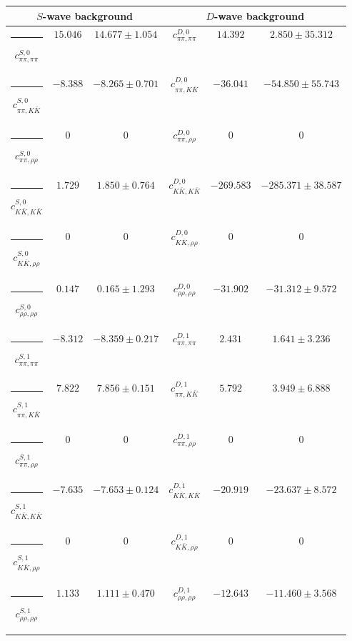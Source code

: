 \begin{table}[h]
\begin{ruledtabular}
\begin{tabular}{c c c c c c c c c}
\end{tabular}
\vspace{2em}
\begin{tabular}{c c c c c c}
\multicolumn{3}{c}{$S$-wave background}  & \multicolumn{3}{c}{$D$-wave background} \\ \hline
\rule[-0.2cm]{-0.1cm}{.55cm} $c^{S,0}_{\pi\pi,\pi\pi}$ &$15.046$ & $14.677 \pm 1.054$ & $c^{D,0}_{\pi\pi,\pi\pi}$ &$14.392$ & $2.850 \pm 35.312$ \\
\rule[-0.2cm]{-0.1cm}{.55cm} $c^{S,0}_{\pi\pi,K\bar K}$ &$-8.388$ & $-8.265 \pm 0.701$ & $c^{D,0}_{\pi\pi,K\bar K}$ &$-36.041$ & $-54.850 \pm 55.743$ \\
\rule[-0.2cm]{-0.1cm}{.55cm} $c^{S,0}_{\pi\pi,\rho\rho}$ &$0$ & $0$ & $c^{D,0}_{\pi\pi,\rho\rho}$ &$0$ & $0$ \\
\rule[-0.2cm]{-0.1cm}{.55cm} $c^{S,0}_{K\bar K,K\bar K}$ &$1.729$ & $1.850 \pm 0.764$ & $c^{D,0}_{K\bar K,K\bar K}$ &$-269.583$ & $-285.371 \pm 38.587$ \\
\rule[-0.2cm]{-0.1cm}{.55cm} $c^{S,0}_{K\bar K,\rho\rho}$ &$0$ & $0$ & $c^{D,0}_{K\bar K,\rho\rho}$ &$0$ & $0$ \\
\rule[-0.2cm]{-0.1cm}{.55cm} $c^{S,0}_{\rho\rho,\rho\rho}$ &$0.147$ & $0.165 \pm 1.293$ & $c^{D,0}_{\rho\rho,\rho\rho}$ &$-31.902$ & $-31.312 \pm 9.572$ \\
\rule[-0.2cm]{-0.1cm}{.55cm} $c^{S,1}_{\pi\pi,\pi\pi}$ &$-8.312$ & $-8.359 \pm 0.217$ & $c^{D,1}_{\pi\pi,\pi\pi}$ &$2.431$ & $1.641 \pm 3.236$ \\
\rule[-0.2cm]{-0.1cm}{.55cm} $c^{S,1}_{\pi\pi,K\bar K}$ &$7.822$ & $7.856 \pm 0.151$ & $c^{D,1}_{\pi\pi,K\bar K}$ &$5.792$ & $3.949 \pm 6.888$ \\
\rule[-0.2cm]{-0.1cm}{.55cm} $c^{S,1}_{\pi\pi,\rho\rho}$ &$0$ & $0$ & $c^{D,1}_{\pi\pi,\rho\rho}$ &$0$ & $0$ \\
\rule[-0.2cm]{-0.1cm}{.55cm} $c^{S,1}_{K\bar K,K\bar K}$ &$-7.635$ & $-7.653 \pm 0.124$ & $c^{D,1}_{K\bar K,K\bar K}$ &$-20.919$ & $-23.637 \pm 8.572$ \\
\rule[-0.2cm]{-0.1cm}{.55cm} $c^{S,1}_{K\bar K,\rho\rho}$ &$0$ & $0$ & $c^{D,1}_{K\bar K,\rho\rho}$ &$0$ & $0$ \\
\rule[-0.2cm]{-0.1cm}{.55cm} $c^{S,1}_{\rho\rho,\rho\rho}$ &$1.133$ & $1.111 \pm 0.470$ & $c^{D,1}_{\rho\rho,\rho\rho}$ &$-12.643$ & $-11.460 \pm 3.568$ \\
\end{tabular}
\end{ruledtabular}
\end{table}
